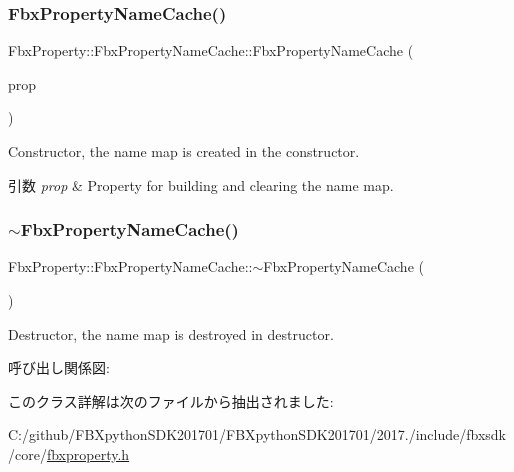 \subsubsection{\texorpdfstring{Fbx\+Property\+Name\+Cache()}{FbxPropertyNameCache()}}
{\footnotesize\ttfamily Fbx\+Property\+::\+Fbx\+Property\+Name\+Cache\+::\+Fbx\+Property\+Name\+Cache (\begin{DoxyParamCaption}\item[{const \hyperlink{class_fbx_property}{Fbx\+Property} \&}]{prop }\end{DoxyParamCaption})}

Constructor, the name map is created in the constructor. 
\begin{DoxyParams}{引数}
{\em prop} & Property for building and clearing the name map. \\
\hline
\end{DoxyParams}
\mbox{\label{class_fbx_property_1_1_fbx_property_name_cache_a4750d4813c1a70064a44718946668f25}} 
\subsubsection{\texorpdfstring{$\sim$\+Fbx\+Property\+Name\+Cache()}{~FbxPropertyNameCache()}}
{\footnotesize\ttfamily Fbx\+Property\+::\+Fbx\+Property\+Name\+Cache\+::$\sim$\+Fbx\+Property\+Name\+Cache (\begin{DoxyParamCaption}{ }\end{DoxyParamCaption})}



Destructor, the name map is destroyed in destructor. 

呼び出し関係図\+:


このクラス詳解は次のファイルから抽出されました\+:\begin{DoxyCompactItemize}
\item 
C\+:/github/\+F\+B\+Xpython\+S\+D\+K201701/\+F\+B\+Xpython\+S\+D\+K201701/2017./include/fbxsdk/core/\hyperlink{fbxproperty_8h}{fbxproperty.\+h}\end{DoxyCompactItemize}

